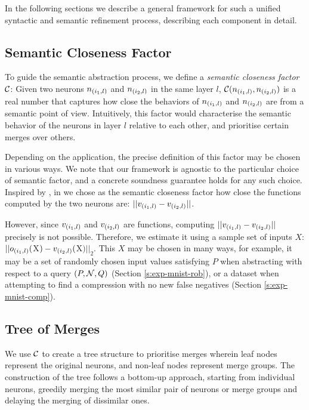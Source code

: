 In the following sections we describe a general framework for such a unified
syntactic and semantic refinement process, describing each component in detail.


\subsection{Semantic Closeness Factor}


To guide the semantic abstraction process, we define a \textit{semantic
closeness factor} $\mathcal{C}$: Given two neurons $n_{(i_1,l)}$ and $n_{(i_2,l)}$ in
the same layer $l$, $\mathcal{C}(n_{(i_1,l)}, n_{(i_2,l)})$ is a real number that
captures how close the behaviors of $n_{(i_1,l)}$ and $n_{(i_2,l)}$ are from a
semantic point of
view. Intuitively, this factor would characterise the semantic behavior of the
neurons in layer $l$ relative to each other, and prioritise certain merges over
others. 

Depending on the application, the precise definition of this factor may be
chosen in various ways. We note that our framework is agnostic to the particular
choice of semantic factor, and a concrete soundness guarantee holds for any such
choice. Inspired by \cite{deep-abstract}, in we chose as the
semantic closeness factor how close the functions computed by the two neurons
are: $||v_{(i_1,l)} - v_{(i_2,l)}||$. 

However, since $v_{(i_1,l)}$ and $v_{(i_2,l)}$ are functions, computing
$||v_{(i_1,l)} - v_{(i_2,l)}||$ precisely is not possible.
Therefore, we estimate it using a sample set of inputs $X$: $||o_{(i_1,l)}($X$)
- v_{(i_2,l)}($X$)||_2$. This $X$ may be chosen in many ways, for example, it
may be a set of randomly chosen input values satisfying $P$ when
abstracting with respect to a query $(P, \mathcal{N}, Q)$
(Section \ref{s:exp-mnist-rob}), or a dataset when attempting to find a
compression with no new false negatives (Section \ref{s:exp-mnist-comp}).

\subsection{Tree of Merges}

We use $\mathcal{C}$ to create a tree structure to prioritise merges wherein leaf nodes
represent the original neurons, and 
non-leaf nodes represent merge groups. The construction of the tree 
follows a bottom-up approach, starting from individual neurons, 
greedily merging the most similar pair of neurons or merge groups
and delaying the merging of dissimilar ones. 


